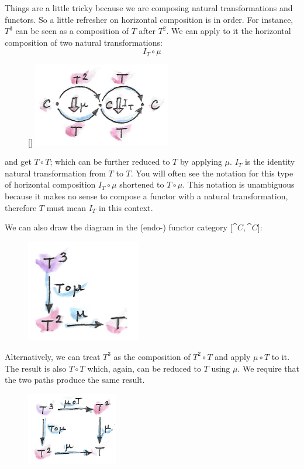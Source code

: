 Things are a little tricky because we are composing natural
transformations and functors. So a little refresher on horizontal
composition is in order. For instance, $T^3$ can be seen as a
composition of $T$ after $T^2$. We can apply to it the
horizontal composition of two natural transformations:
\[I_T \circ \mu\]

\begin{figure}
\raisebox{0pt}[\dimexpr{}\baselineskip\relax]{
\includegraphics[width=60mm]{images/assoc1.png}}%
\end{figure}

\noindent
and get $T \circ T$; which can be further reduced to $T$ by
applying $\mu$. $I_T$ is the identity natural transformation
from $T$ to $T$. You will often see the notation for this
type of horizontal composition $I_T \circ \mu$ shortened to
$T \circ \mu$. This notation is unambiguous because it makes no sense to
compose a functor with a natural transformation, therefore $T$
must mean $I_T$ in this context.

\noindent
We can also draw the diagram in the (endo-) functor category ${[}\cat{C}, \cat{C}{]}$:

\begin{figure}[H]
\centering
\includegraphics[width=50mm]{images/assoc2.png}
\end{figure}

\noindent
Alternatively, we can treat $T^3$ as the composition of
$T^2 \circ T$ and apply $\mu \circ T$ to it. The result is also
$T \circ T$ which, again, can be reduced to $T$ using $\mu$. We
require that the two paths produce the same result.

\begin{figure}[H]
\centering
\includegraphics[width=40mm]{images/assoc.png}
\end{figure}

